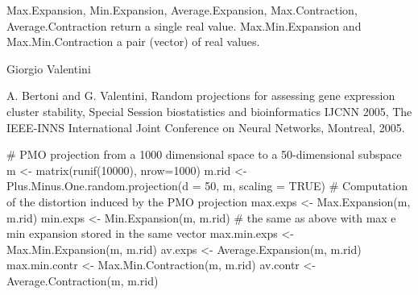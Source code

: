 \documentclass{article}
\begin{document}
\begin{Value}
Max.Expansion, Min.Expansion,  Average.Expansion, Max.Contraction, Average.Contraction return a single real value.
Max.Min.Expansion and Max.Min.Contraction a pair (vector) of real values.
\end{Value}
\begin{Author}\relax
Giorgio Valentini 
\end{Author}
\begin{References}\relax
A. Bertoni and   G. Valentini,
Random projections for assessing gene expression cluster stability, Special Session biostatistics and bioinformatics
IJCNN 2005, The IEEE-INNS International Joint Conference on Neural Networks, Montreal, 2005.
\end{References}
\begin{Examples}
\begin{ExampleCode}
# PMO projection from a 1000 dimensional space to a 50-dimensional subspace
m <- matrix(runif(10000), nrow=1000)
m.rid <- Plus.Minus.One.random.projection(d = 50, m, scaling = TRUE)
# Computation of the distortion induced by the PMO projection
max.exps <- Max.Expansion(m, m.rid)
min.exps <- Min.Expansion(m, m.rid)
# the same as above with max e min expansion stored in the same vector
max.min.exps <- Max.Min.Expansion(m, m.rid) 
av.exps <- Average.Expansion(m, m.rid)
max.min.contr <- Max.Min.Contraction(m, m.rid)
av.contr <- Average.Contraction(m, m.rid)
\end{ExampleCode}
\end{Examples}
\end{document}
